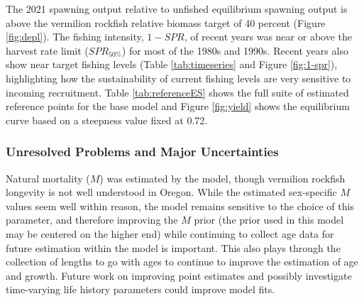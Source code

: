\documentclass[11pt,
  english,
  a4paper,
]{article}
\begin{document}
The 2021 spawning output relative to unfished equilibrium spawning output is above the vermilion rockfish relative biomass target of 40 percent (Figure \ref{fig:depl}). The fishing intensity, {\(1-SPR\)\leavevmode\tagmcend\tagstructend}, of recent years was near or above the harvest rate limit ({\(SPR_{50\%}\)\leavevmode\tagmcend\tagstructend}) for most of the 1980s and 1990s. Recent years also show near target fishing levels (Table \ref{tab:timeseries} and Figure \ref{fig:1-spr}), highlighting how the sustainability of current fishing levels are very sensitive to incoming recruitment. Table \ref{tab:referenceES} shows the full suite of estimated reference points for the base model and Figure \ref{fig:yield} shows the equilibrium curve based on a steepness value fixed at 0.72.

\leavevmode\tagmcend\tagstructend\par


\hypertarget{unresolved-problems-and-major-uncertainties-1}{%
\subsubsection{Unresolved Problems and Major Uncertainties}\label{unresolved-problems-and-major-uncertainties-1}}

\leavevmode\tagmcend\tagstructend


Natural mortality ({\(M\)\leavevmode\tagmcend\tagstructend}) was estimated by the model, though vermilion rockfish longevity is not well understood in Oregon. While the estimated sex-specific {\(M\)\leavevmode\tagmcend\tagstructend} values seem well within reason, the model remains sensitive to the choice of this parameter, and therefore improving the {\(M\)\leavevmode\tagmcend\tagstructend} prior (the prior used in this model may be centered on the higher end) while continuing to collect age data for future estimation within the model is important. This also plays through the collection of lengths to go with ages to continue to improve the estimation of age and growth. Future work on improving point estimates and possibly investigate time-varying life history parameters could improve model fits.
\end{document}
